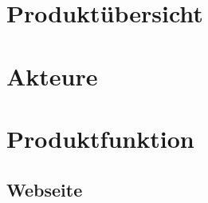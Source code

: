 \documentclass[10pt,a4paper]{article}
\begin{document}



\section{Produkt\"ubersicht}
\begin{figure}[H]
	
\end{figure}
\section{Akteure}

\section{Produktfunktion}
\subsection{Webseite}
\end{document}
